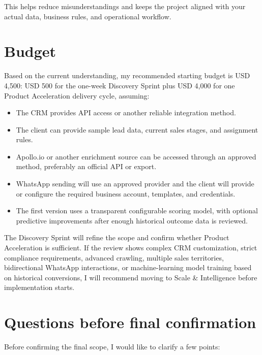 \documentclass[11pt,a4paper]{article}
\begin{document}
This helps reduce misunderstandings and keeps the project aligned with your actual data, business rules, and operational workflow.\par

\section*{Budget}

Based on the current understanding, my recommended starting budget is USD 4,500: USD 500 for the one-week Discovery Sprint plus USD 4,000 for one Product Acceleration delivery cycle, assuming:\par

\begin{itemize}
\item The CRM provides API access or another reliable integration method.
\item The client can provide sample lead data, current sales stages, and assignment rules.
\item Apollo.io or another enrichment source can be accessed through an approved method, preferably an official API or export.
\item WhatsApp sending will use an approved provider and the client will provide or configure the required business account, templates, and credentials.
\item The first version uses a transparent configurable scoring model, with optional predictive improvements after enough historical outcome data is reviewed.
\end{itemize}

The Discovery Sprint will refine the scope and confirm whether Product Acceleration is sufficient. If the review shows complex CRM customization, strict compliance requirements, advanced crawling, multiple sales territories, bidirectional WhatsApp interactions, or machine-learning model training based on historical conversions, I will recommend moving to Scale \& Intelligence before implementation starts.\par

\section*{Questions before final confirmation}

Before confirming the final scope, I would like to clarify a few points:\par
\end{document}
